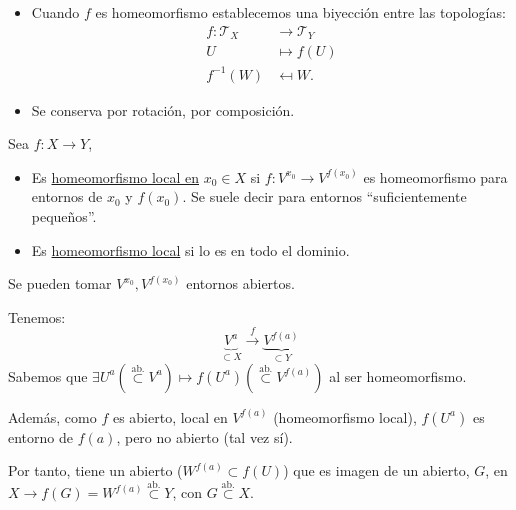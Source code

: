 \begin{obs}
\begin{itemize}
    \item Cuando $f$ es homeomorfismo establecemos una biyección entre las topologías:
    \begin{align*}
        f: \mathcal{T}_X &\rightarrow \mathcal{T}_Y\\
        U &\mapsto f\left( U \right)\\
        f^{-1}\left( W \right) &\mapsfrom W 
    .\end{align*}

    \item Se conserva por rotación, por composición.
\end{itemize}
\end{obs}

\begin{defi}
Sea $f: X \rightarrow Y$,
\begin{itemize}
    \item Es \underline{homeomorfismo local en} $x_0 \in X$ si $f: V^{x_0} \rightarrow V^{f\left( x_0 \right)}$ es homeomorfismo para entornos de $x_0$ y $f\left( x_0 \right)$. Se suele decir para entornos ``suficientemente pequeños''.

    \item Es \underline{homeomorfismo local} si lo es en todo el dominio. 
\end{itemize}
\end{defi}

\begin{obs}
Se pueden tomar $V^{x_0}, V^{f\left( x_0 \right)}$ entornos abiertos.
\begin{demo}
Tenemos: 
\[
    \underbrace{V^a}_{\subset X} \xrightarrow{f} \underbrace{V^{f\left( a \right)}}_{\subset Y} 
\]
Sabemos que $\exists U^a (\stackrel{\text{ab.}}{\subset} V^a) \mapsto f\left( U^a \right) (\stackrel{\text{ab.}}{\subset} V^{f\left( a \right)})$ al ser homeomorfismo. 

Además, como $f$ es abierto, local en $V^{f\left( a \right)}$ (homeomorfismo local), $f\left( U^a \right)$ es entorno de $f\left( a \right)$, pero no abierto (tal vez sí). 

Por tanto, tiene un abierto ($W^{f\left( a \right)} \subset f\left( U \right)$) que es imagen de un abierto, $G$, en $X \rightarrow f\left( G \right) = W^{f\left( a \right)} \stackrel{\text{ab.}}{\subset} Y$, con $G \stackrel{\text{ab.}}{\subset} X$.
\end{demo}
\end{obs}

